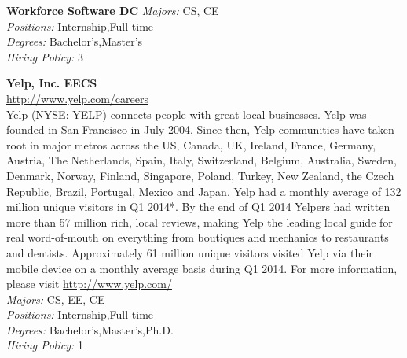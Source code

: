 \documentclass[twoside]{article}
\begin{document}
\begin{center}
\begin{multicols}{2}
\begin{minipage}{.95\columnwidth}{\Large\bf Workforce Software \hfill DC}
    \emph{Majors:} CS, CE\\
    \emph{Positions:} Internship,Full-time\\
    \emph{Degrees:} Bachelor's,Master's\\
    \emph{Hiring Policy:} 3\\
\end{minipage}
 \begin{minipage}{.95\columnwidth}{\Large\bf Yelp, Inc. \hfill EECS}\\
    \url{http://www.yelp.com/careers}\\
    Yelp (NYSE: YELP) connects people with great local businesses. Yelp was founded in San Francisco in July 2004. Since then, Yelp communities have taken root in major metros across the US, Canada, UK, Ireland, France, Germany, Austria, The Netherlands, Spain, Italy, Switzerland, Belgium, Australia, Sweden, Denmark, Norway, Finland, Singapore, Poland, Turkey, New Zealand, the Czech Republic, Brazil, Portugal, Mexico and Japan. Yelp had a monthly average of 132 million unique visitors in Q1 2014*. By the end of Q1 2014 Yelpers had written more than 57 million rich, local reviews, making Yelp the leading local guide for real word-of-mouth on everything from boutiques and mechanics to restaurants and dentists. Approximately 61 million unique visitors visited Yelp via their mobile device on a monthly average basis during Q1 2014. For more information, please visit \url{http://www.yelp.com/}\\
    \emph{Majors:} CS, EE, CE\\
    \emph{Positions:} Internship,Full-time\\
    \emph{Degrees:} Bachelor's,Master's,Ph.D.\\
    \emph{Hiring Policy:} 1\\
\end{minipage}
 \end{multicols}\end{center}
    \startcompanysection
\end{document}
